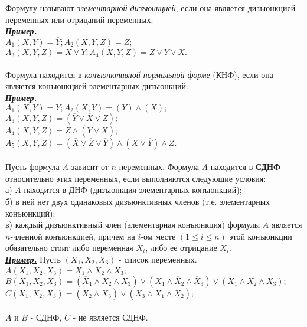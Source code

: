 \documentclass{article}
\begin{document}
	Формулу называют \textit{элементарной дизъюнкцией}, если она является
	дизъюнкцией переменных или отрицаний переменных.\\
	\underline{\textit{\textbf{Пример.}}}\\
	$A_1 (X, Y) = \overline{Y}; A_2 (X, Y, Z) = Z;$\\
	$A_3 (X, Y, Z) = X \vee Y; A_4 (X, Y, Z) = \overline{Z} \vee \overline{Y} \vee X.$
	\\\\
	Формула находится в \textit{конъюнктивной нормальной форме} (КНФ), если она
	является конъюнкцией элементарных дизъюнкций.\\
	\underline{\textit{\textbf{Пример.}}}\\
	$A_1 (X, Y) = Y; A_2 (X, Y) = (Y) \wedge (X);$\\
	$A_3 (X, Y, Z) = (\overline{Y} \vee \overline{X} \vee Z);$\\
	$A_4 (X, Y, Z) = \overline{Z} \wedge (\overline{Y} \vee X);$\\
	$A_5 (X, Y, Z) = (\overline{X} \vee \overline{Z} \vee \overline{Y}) \wedge (X \vee \overline{Y}) \wedge Z.$
	\\\\
	Пусть формула $A$ зависит от $n$ переменных. Формула $A$ находится в \textbf{СДНФ} относительно этих
	переменных, если выполняются следующие условия:\\
	а) $A$ находится в ДНФ (дизъюнкция элементарных конъюнкций);\\
	б) в ней нет двух одинаковых дизъюнктивных членов (т.е. 
	элементарных конъюнкций);\\
	в) каждый дизъюнктивный член (элементарная конъюнкция) формулы $A$
	является $n$-членной конъюнкцией, причем на $i$-ом месте $(1 \leq i \leq n)$
	этой конъюнкции обязательно стоит либо переменная $X_i$, либо ее отрицание
	$\overline{X}_i$.\\
	\newpage
	\underline{\textit{\textbf{Пример.}}} Пусть $(X_1, X_2, X_3)$ - список переменных.\\
	$A (X_1, X_2, X_3) = X_1 \wedge \overline{X}_2 \wedge X_3;$\\
	$B (X_1, X_2, X_3) = (\overline{X}_1 \wedge X_2 \wedge X_3) \vee (X_1 \wedge \overline{X}_2 \wedge \overline{X}_3) \vee (X_1 \wedge X_2 \wedge X_3);$\\
	$C (X_1, X_2, X_3) = (\overline{X}_2 \wedge X_3) \vee (\overline{X}_3 \wedge X_1 \wedge X_2);$
	\\\\
	$A$ и $B$ - СДНФ, $C$ - не является СДНФ.
\end{document}
